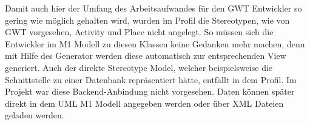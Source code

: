Damit auch hier der Umfang des Arbeitsaufwandes für den GWT Entwickler so gering wie möglich gehalten wird, wurden im Profil die Stereotypen, wie von GWT vorgesehen, Activity und Place nicht angelegt. So müssen sich die Entwickler im M1 Modell zu diesen Klassen keine Gedanken mehr machen, denn mit Hilfe des Generator werden diese automatisch zur entsprechenden View generiert. 
Auch der direkte Stereotype Model, welcher beispielsweise die Schnittstelle zu einer Datenbank repräsentiert hätte, entfällt in dem Profil. Im Projekt war diese Backend-Anbindung nicht vorgesehen. Daten können später direkt in dem UML M1 Modell angegeben werden oder über XML Dateien geladen werden.